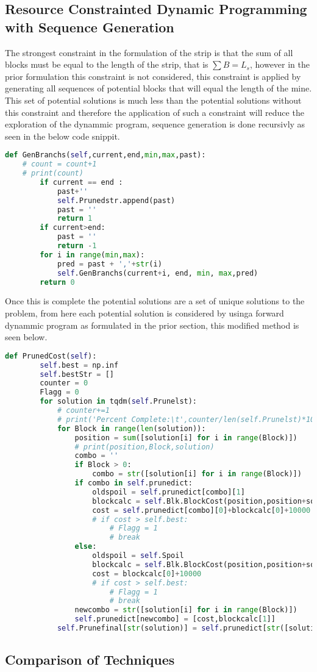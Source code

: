 \subsection{Resource Constrainted Dynamic Programming with Sequence Generation}
The strongest constraint in the formulation of the strip is that the sum of all blocks must be equal to the length of the strip, that is $\sum B = L_s$, however in the prior formulation this constraint is not considered, this constraint is applied by generating all sequences of potential blocks that will equal the length of the mine. This set of potential solutions is much less than the potential solutions without this constraint and therefore the application of such a constraint will reduce the exploration of the dynammic program, sequence generation is done recursivly as seen in the below code snippit. 
\begin{lstlisting}[language = python]
def GenBranchs(self,current,end,min,max,past):
	# count = count+1
	# print(count)
		if current == end :
			past+''
			self.Prunedstr.append(past)
			past = ''
			return 1
		if current>end:
			past = ''
			return -1
		for i in range(min,max):
			pred = past + ','+str(i)
			self.GenBranchs(current+i, end, min, max,pred)
		return 0
\end{lstlisting}
Once this is complete the potential solutions are a set of unique solutions to the problem, from here each potential solution is considered by usinga forward dynammic program as formulated in the prior section, this modified method is seen below. 
\begin{lstlisting}[language = python]
def PrunedCost(self):
		self.best = np.inf
		self.bestStr = []
		counter = 0
		Flagg = 0
		for solution in tqdm(self.Prunelst):
			# counter+=1
			# print('Percent Complete:\t',counter/len(self.Prunelst)*100,'%')
			for Block in range(len(solution)):
				position = sum([solution[i] for i in range(Block)])
				# print(position,Block,solution)
				combo = ''
				if Block > 0:
					combo = str([solution[i] for i in range(Block)])
				if combo in self.prunedict:
					oldspoil = self.prunedict[combo][1]
					blockcalc = self.Blk.BlockCost(position,position+solution[Block],oldspoil)
					cost = self.prunedict[combo][0]+blockcalc[0]+10000
					# if cost > self.best:
						# Flagg = 1
						# break
				else:
					oldspoil = self.Spoil
					blockcalc = self.Blk.BlockCost(position,position+solution[Block],oldspoil)
					cost = blockcalc[0]+10000
					# if cost > self.best:
						# Flagg = 1
						# break
				newcombo = str([solution[i] for i in range(Block)])
				self.prunedict[newcombo] = [cost,blockcalc[1]]
			self.Prunefinal[str(solution)] = self.prunedict[str([solution[i] for i in range(Block)])]

\end{lstlisting}
\subsection{Comparison of Techniques}




